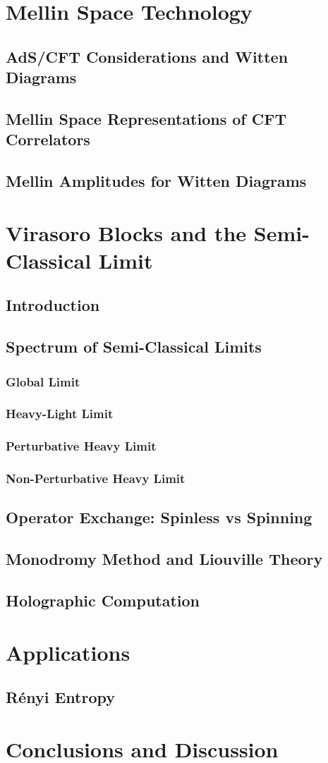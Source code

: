   \section{Mellin Space Technology}
  \subsection{AdS/CFT Considerations and Witten Diagrams}
  \subsection{Mellin Space Representations of CFT Correlators}
  \subsection{Mellin Amplitudes for Witten Diagrams}
  \section{Virasoro Blocks and the Semi-Classical Limit}
  \subsection{Introduction}
  \subsection{Spectrum of Semi-Classical Limits}
  \subsubsection{Global Limit}
  \subsubsection{Heavy-Light Limit}
  \subsubsection{Perturbative Heavy Limit}
  \subsubsection{Non-Perturbative Heavy Limit}
  \subsection{Operator Exchange: Spinless vs Spinning}
  \subsection{Monodromy Method and Liouville Theory}
  \subsection{Holographic Computation}
  \section{Applications}
  \subsection{R\'enyi Entropy}
  \section{Conclusions and Discussion}
